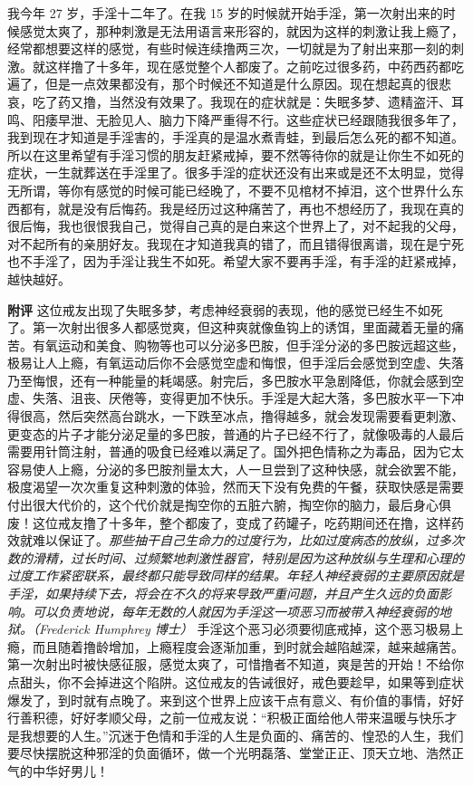 \begin{case}
    我今年 27 岁，手淫十二年了。在我 15 岁的时候就开始手淫，第一次射出来的时候感觉太爽了，那种刺激是无法用语言来形容的，就因为这样的刺激让我上瘾了，经常都想要这样的感觉，有些时候连续撸两三次，一切就是为了射出来那一刻的刺激。就这样撸了十多年，现在感觉整个人都废了。之前吃过很多药，中药西药都吃遍了，但是一点效果都没有，那个时候还不知道是什么原因。现在想起真的很悲哀，吃了药又撸，当然没有效果了。我现在的症状就是：失眠多梦、遗精盗汗、耳鸣、阳痿早泄、无脸见人、脑力下降严重得不行。这些症状已经跟随我很多年了，我到现在才知道是手淫害的，手淫真的是温水煮青蛙，到最后怎么死的都不知道。所以在这里希望有手淫习惯的朋友赶紧戒掉，要不然等待你的就是让你生不如死的症状，一生就葬送在手淫里了。很多手淫的症状还没有出来或是还不太明显，觉得无所谓，等你有感觉的时候可能已经晚了，不要不见棺材不掉泪，这个世界什么东西都有，就是没有后悔药。我是经历过这种痛苦了，再也不想经历了，我现在真的很后悔，我也很恨我自己，觉得自己真的是白来这个世界上了，对不起我的父母，对不起所有的亲朋好友。我现在才知道我真的错了，而且错得很离谱，现在是宁死也不手淫了，因为手淫让我生不如死。希望大家不要再手淫，有手淫的赶紧戒掉，越快越好。

    \textbf{附评} 这位戒友出现了失眠多梦，考虑神经衰弱的表现，他的感觉已经生不如死了。第一次射出很多人都感觉爽，但这种爽就像鱼钩上的诱饵，里面藏着无量的痛苦。有氧运动和美食、购物等也可以分泌多巴胺，但手淫分泌的多巴胺远超这些，极易让人上瘾，有氧运动后你不会感觉空虚和悔恨，但手淫后会感觉到空虚、失落乃至悔恨，还有一种能量的耗竭感。射完后，多巴胺水平急剧降低，你就会感到空虚、失落、沮丧、厌倦等，变得更加不快乐。手淫是大起大落，多巴胺水平一下冲得很高，然后突然高台跳水，一下跌至冰点，撸得越多，就会发现需要看更刺激、更变态的片子才能分泌足量的多巴胺，普通的片子已经不行了，就像吸毒的人最后需要用针筒注射，普通的吸食已经难以满足了。国外把色情称之为毒品，因为它太容易使人上瘾，分泌的多巴胺剂量太大，人一旦尝到了这种快感，就会欲罢不能，极度渴望一次次重复这种刺激的体验，然而天下没有免费的午餐，获取快感是需要付出很大代价的，这个代价就是掏空你的五脏六腑，掏空你的脑力，最后身心俱废！这位戒友撸了十多年，整个都废了，变成了药罐子，吃药期间还在撸，这样药效就难以保证了。\textit{那些抽干自己生命力的过度行为，比如过度病态的放纵，过多次数的滑精，过长时间、过频繁地刺激性器官，特别是因为这种放纵与生理和心理的过度工作紧密联系，最终都只能导致同样的结果。年轻人神经衰弱的主要原因就是手淫，如果持续下去，将会在不久的将来导致严重问题，并且产生久远的负面影响。可以负责地说，每年无数的人就因为手淫这一项恶习而被带入神经衰弱的地狱。（Frederick Humphrey 博士）} 手淫这个恶习必须要彻底戒掉，这个恶习极易上瘾，而且随着撸龄增加，上瘾程度会逐渐加重，到时就会越陷越深，越来越痛苦。第一次射出时被快感征服，感觉太爽了，可惜撸者不知道，爽是苦的开始！不给你点甜头，你不会掉进这个陷阱。这位戒友的告诫很好，戒色要趁早，如果等到症状爆发了，到时就有点晚了。来到这个世界上应该干点有意义、有价值的事情，好好行善积德，好好孝顺父母，之前一位戒友说：“积极正面给他人带来温暖与快乐才是我想要的人生。”沉迷于色情和手淫的人生是负面的、痛苦的、惶恐的人生，我们要尽快摆脱这种邪淫的负面循环，做一个光明磊落、堂堂正正、顶天立地、浩然正气的中华好男儿！
\end{case}


